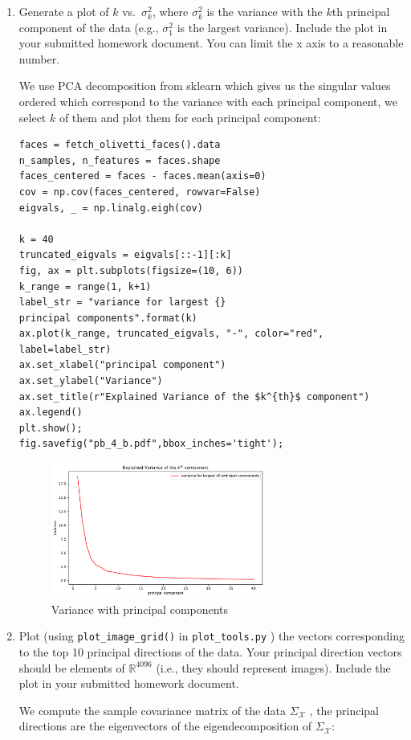 \documentclass[12pt,twoside]{article}
\begin{document}
\begin{enumerate}
\begin{enumerate}
\item Generate a plot of $k$ vs.~$\sigma^2_k$, where $\sigma^2_k$ is
the variance  with the $k$th principal component of the data (e.g., $\sigma^2_1$
is the largest variance). 
Include
the plot in your submitted homework document. You can limit the x axis to a reasonable number.

We use PCA decomposition from sklearn which gives us the singular values ordered which correspond to the variance with each principal component, we select $k$ of them
and plot them for each principal component:
\begin{verbatim}
faces = fetch_olivetti_faces().data
n_samples, n_features = faces.shape
faces_centered = faces - faces.mean(axis=0)
cov = np.cov(faces_centered, rowvar=False)
eigvals, _ = np.linalg.eigh(cov)

k = 40
truncated_eigvals = eigvals[::-1][:k]
fig, ax = plt.subplots(figsize=(10, 6))
k_range = range(1, k+1)
label_str = "variance for largest {} 
principal components".format(k)
ax.plot(k_range, truncated_eigvals, "-", color="red", 
label=label_str)
ax.set_xlabel("principal component")
ax.set_ylabel("Variance")
ax.set_title(r"Explained Variance of the $k^{th}$ component")
ax.legend()
plt.show();
fig.savefig("pb_4_b.pdf",bbox_inches='tight');
\end{verbatim}

	\begin{figure}[H]
		\centering
		\includegraphics[width=200pt]{figures/pb_4_b.pdf}
		\caption{Variance with principal components}
		\label{fig6}
	\end{figure}

\item  Plot (using  \verb|plot_image_grid()| in
\verb|plot_tools.py| ) the vectors
corresponding to the top 10 principal directions of the data.
Your principal direction vectors should be elements of $\mathbb{R}^{4096}$ (i.e., they
should represent images).
Include the plot in your submitted homework document.

We compute the sample covariance matrix of the data $\Sigma_{\mathcal{X}}$ ,
 the principal directions are the eigenvectors of the eigendecomposition of  $\Sigma_{\mathcal{X}}$:
 

\end{enumerate}
\end{enumerate}
\end{document}
